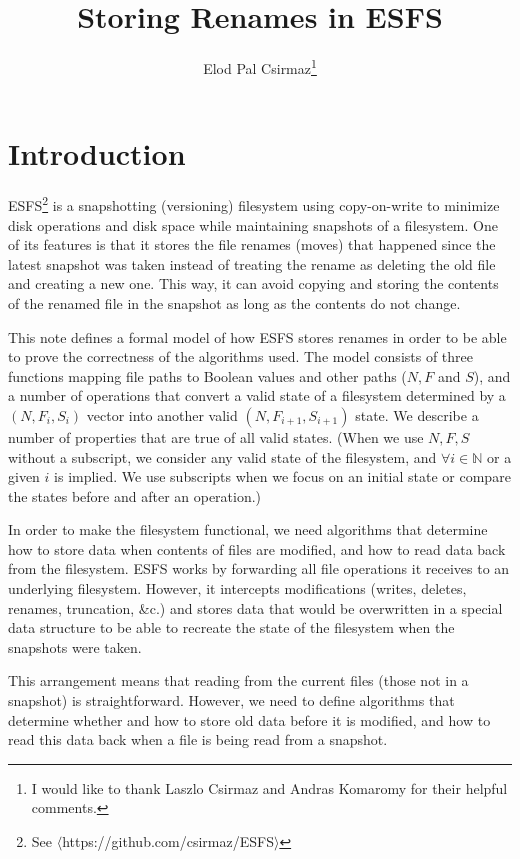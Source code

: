 \documentclass[12pt]{article}
\newcommand{\setn}{\mathbb{N}}
\begin{document}
\title{Storing Renames in ESFS}

\author{Elod Pal Csirmaz\thanks{I would like to thank Laszlo Csirmaz and Andras Komaromy for their helpful comments.}}

\maketitle

\section{Introduction}

ESFS\footnote{See $\langle$https://github.com/csirmaz/ESFS$\rangle$}
is a snapshotting (versioning) filesystem
using copy-on-write to
minimize disk operations and disk space while maintaining snapshots of a filesystem.
One of its features is that it stores the file renames
(moves) that happened since the latest snapshot was taken
instead of treating the rename as deleting the old file and creating a new one.
This way, it can avoid copying and storing the contents of the renamed file in the snapshot
as long as the contents do not change.

This note defines a formal model of how ESFS stores renames
in order to be able to prove the correctness of the algorithms used.
The model consists of three functions mapping file paths to Boolean values and
other paths ($N, F$ and $S$), and a number of operations that convert a
valid state of a filesystem determined by a $(N, F_i, S_i)$ vector into another
valid $(N, F_{i+1}, S_{i+1})$ state.
We describe a number of properties that are true of all valid states.
(When we use $N, F, S$ without a subscript, we consider any valid state of the filesystem,
and $\forall i\in\setn$ or a given $i$ is implied.
We use subscripts when we focus on an initial state or compare the states before
and after an operation.)

In order to make the filesystem functional, we need algorithms that determine how to
store data when contents of files are modified, and how to read data back from the filesystem.
ESFS works by forwarding all file operations it receives to an underlying filesystem.
However, it intercepts modifications (writes, deletes, renames, truncation, \&c.) and
stores data that would be overwritten in a special data structure to be able to recreate
the state of the filesystem when the snapshots were taken.

This arrangement means that reading from the current files (those not in a snapshot) is straightforward.
However, we need to define algorithms that determine whether and how to store old data
before it is modified, and how to read this data back when a file is being read from a snapshot.
\end{document}
